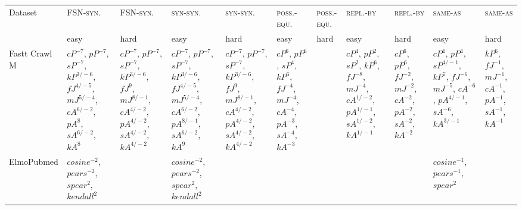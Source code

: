 \documentclass[letterpaper]{article} %
\newcommand{\dataset}[1]{\textsc{#1}}
\begin{document}
\begin{sidewaystable*}
    \centering
    \small
    \begin{tabular}{l l l l l l l l l l l }
    \toprule
         Dataset & \dataset{FSN-syn.} & \dataset{FSN-syn.} & \dataset{syn-syn.} & \dataset{syn-syn.}& \dataset{poss.-equ.} & \dataset{poss.-equ.} & \dataset{repl.-by} & \dataset{repl.-by} & \dataset{same-as} & \dataset{same-as} \\
& easy & hard & easy & hard& easy & hard & easy & hard & easy & hard \\ 
         \midrule
\multirow{10}{1.7cm}{Fastt Crawl M} & \multirow{10}{1.7cm}{$cP^{-7}$, $pP^{-7}$, $sP^{-7}$, $kP^{3/-6}$, $fJ^{4/-5}$, $mJ^{5/-4}$, $cA^{6/-2}$, $pA^{8}$, $sA^{6/-2}$, $kA^{8}$} & \multirow{10}{1.7cm}{$cP^{-7}$, $pP^{-7}$, $sP^{-7}$, $kP^{3/-6}$, $fJ^{9}$, $mJ^{8/-1}$, $cA^{4/-2}$, $pA^{4/-2}$, $sA^{4/-2}$, $kA^{4/-2}$} & \multirow{10}{1.7cm}{$cP^{-7}$, $pP^{-7}$, $sP^{-7}$, $kP^{3/-6}$, $fJ^{4/-5}$, $mJ^{5/-4}$, $cA^{6/-2}$, $pA^{8/-1}$, $sA^{6/-2}$, $kA^{9}$} & \multirow{10}{1.7cm}{$cP^{-7}$, $pP^{-7}$, $sP^{-7}$, $kP^{3/-6}$, $fJ^{9}$, $mJ^{8/-1}$, $cA^{4/-2}$, $pA^{4/-2}$, $sA^{4/-2}$, $kA^{4/-2}$} & \multirow{10}{1.7cm}{$cP^{6}$, $pP^{6}$, $sP^{4}$, $kP^{6}$, $fJ^{-4}$, $mJ^{-4}$, $cA^{-4}$, $pA^{-3}$, $sA^{-4}$, $kA^{-3}$} & \multirow{10}{1.7cm}{} & \multirow{10}{1.7cm}{$cP^{4}$, $pP^{2}$, $sP^{2}$, $kP^{6}$, $fJ^{-8}$, $mJ^{-4}$, $cA^{1/-2}$, $pA^{1/-1}$, $sA^{1/-2}$, $kA^{1/-1}$} & \multirow{10}{1.7cm}{$cP^{6}$, $pP^{6}$, $fJ^{-2}$, $mJ^{-2}$, $cA^{-2}$, $pA^{-2}$, $sA^{-2}$, $kA^{-2}$} & \multirow{10}{1.7cm}{$cP^{4}$, $pP^{4}$, $sP^{4/-1}$, $kP^{7}$, $fJ^{-6}$, $mJ^{-5}$, $cA^{-6}$, $pA^{4/-1}$, $sA^{-6}$, $kA^{3/-1}$} & \multirow{10}{1.7cm}{$kP^{6}$, $fJ^{-1}$, $mJ^{-1}$, $cA^{-1}$, $pA^{-1}$, $sA^{-1}$, $kA^{-1}$} \\ \\ \\ \\ \\ \\ \\ \\ \\ \\
\midrule
\multirow{4}{1.7cm}{ElmoPubmed} & \multirow{4}{1.7cm}{$cosine^{-2}$, $pears^{-2}$, $spear^{2}$, $kendall^{2}$} & \multirow{4}{1.7cm}{} & \multirow{4}{1.7cm}{$cosine^{-2}$, $pears^{-2}$, $spear^{2}$, $kendall^{2}$} & \multirow{4}{1.7cm}{} & \multirow{4}{1.7cm}{} & \multirow{4}{1.7cm}{} & \multirow{4}{1.7cm}{} & \multirow{4}{1.7cm}{} & \multirow{4}{1.7cm}{$cosine^{-1}$, $pears^{-1}$, $spear^{2}$} & \multirow{4}{1.7cm}{} \\ \\ \\ \\

\end{tabular}
\end{sidewaystable*}
\end{document}
